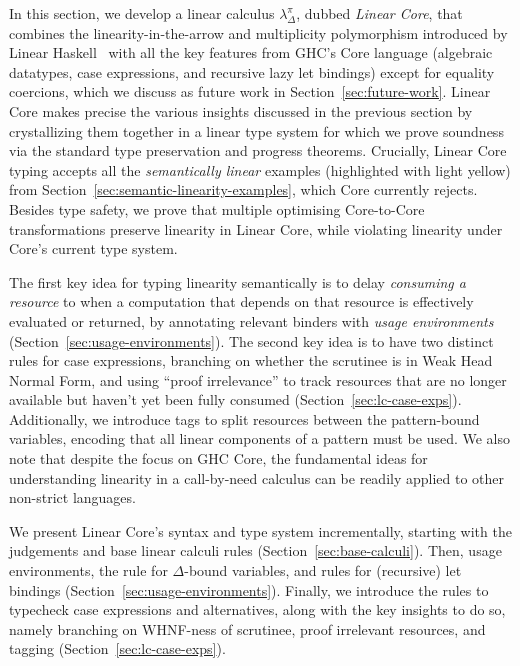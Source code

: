 \documentclass[acmsmall,review,anonymous,screen]{acmart}
\newcommand{\notyetcolorname}{light yellow}
\begin{document}
In this section, we develop a linear calculus $\lambda_\Delta^\pi$,
dubbed \emph{Linear Core}, that combines the linearity-in-the-arrow
and multiplicity polymorphism introduced by Linear
Haskell~\cite{cite:linearhaskell} with all the key features from GHC's Core
language (algebraic datatypes, case expressions, and recursive lazy let bindings)
except for equality coercions, which we discuss as future work in
Section~\ref{sec:future-work}.
%
%
Linear Core makes precise the various insights discussed in the
previous section by crystallizing them together in a linear type system for which we
prove soundness via the standard type preservation and progress theorems. Crucially,
Linear Core typing accepts all the \emph{semantically linear} examples
(highlighted with \colorbox{notyet}{\notyetcolorname})
from Section~\ref{sec:semantic-linearity-examples}, which Core currently
rejects.
%
Besides type safety, we prove that multiple optimising Core-to-Core
transformations preserve linearity in Linear Core, while violating linearity
under Core's current type system.
%

The first key idea for typing linearity semantically is to delay \emph{consuming a
resource} to when a computation that depends on that resource is effectively
evaluated or returned, by annotating relevant binders with \emph{usage
environments} (Section~\ref{sec:usage-environments}).
%
The second key idea is to have two distinct rules for case
expressions, branching on whether the scrutinee is in Weak Head Normal
Form, and using ``proof irrelevance'' to track resources that are no
longer available but haven't yet been fully consumed
(Section~\ref{sec:lc-case-exps}). Additionally, we introduce tags to split
resources between the pattern-bound variables, %
encoding that all linear components of a pattern must be used.
% 
We also note that despite the focus on GHC Core, the fundamental ideas for
understanding linearity in a call-by-need calculus can be readily applied to
other non-strict languages.

We present Linear Core's syntax and type system incrementally, starting with the
judgements and base linear calculi rules (Section~\ref{sec:base-calculi}).
%
Then, usage environments, the rule for $\Delta$-bound variables, and rules for
(recursive) let bindings (Section~\ref{sec:usage-environments}).
%
Finally, we introduce the rules to typecheck case expressions and alternatives,
along with the key insights to do so, namely branching on WHNF-ness of
scrutinee, proof irrelevant resources, and tagging (Section~\ref{sec:lc-case-exps}).
\end{document}
